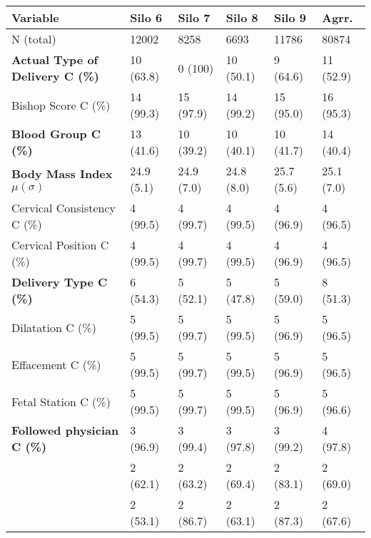 
\begin{tabular}{llllll}
   \toprule
   Variable &               Silo 6 &               Silo 7 &               Silo 8 &               Silo 9 &                Agrr. \\
   \midrule
   
   \hspace*{2mm}  N (total) &                12002 &                 8258 &                 6693 &                11786 &                80874 \\
   
   \textbf{Actual Type of Delivery C (\%)} & 10 (63.8) & 0 (100) & 10 (50.1) & 9 (64.6) & 11 (52.9) \\
   Bishop Score C (\%) & 14 (99.3) & 15 (97.9) & 14 (99.2) & 15 (95.0) & 16 (95.3) \\
   \textbf{Blood Group C (\%)} & 13 (41.6) & 10 (39.2) & 10 (40.1) & 10 (41.7) & 14 (40.4) \\
   \textbf{Body Mass Index $\mu (\sigma)$ } & 24.9 (5.1) & 24.9 (7.0) & 24.8 (8.0) & 25.7 (5.6) & 25.1 (7.0) \\
   Cervical Consistency C (\%)  & 4 (99.5) & 4 (99.7) & 4 (99.5) & 4 (96.9) & 4 (96.5) \\
   Cervical Position C (\%) & 4 (99.5) & 4 (99.7) & 4 (99.5) & 4 (96.9) & 4 (96.5) \\
   \textbf{Delivery Type C (\%)} & 6 (54.3) & 5 (52.1) & 5 (47.8) & 5 (59.0) & 8 (51.3) \\
   Dilatation C (\%) & 5 (99.5) & 5 (99.7) & 5 (99.5) & 5 (96.9) & 5 (96.5) \\
   Effacement C (\%)  & 5 (99.5) & 5 (99.7) & 5 (99.5) & 5 (96.9) & 5 (96.5) \\
   Fetal Station C (\%) & 5 (99.5) & 5 (99.7) & 5 (99.5) & 5 (96.9) & 5 (96.6) \\
   \textbf{Followed physician C (\%)} & 3 (96.9) & 3 (99.4) & 3 (97.8) & 3 (99.2) & 4 (97.8) \\
   \textbf{\begin{minipage}{3.8cm}\setstretch{0.65}Followed physician hospital delivery C (\%)\vspace{1mm}\end{minipage}}& 2 (62.1) & 2 (63.2) & 2 (69.4) & 2 (83.1) & 2 (69.0) \\
   \textbf{\begin{minipage}{3.8cm}\setstretch{0.65}Followed physician primary care C (\%)\vspace{1mm}\end{minipage}} & 2 (53.1) & 2 (86.7) & 2 (63.1) & 2 (87.3) & 2 (67.6) \\

\end{tabular}
